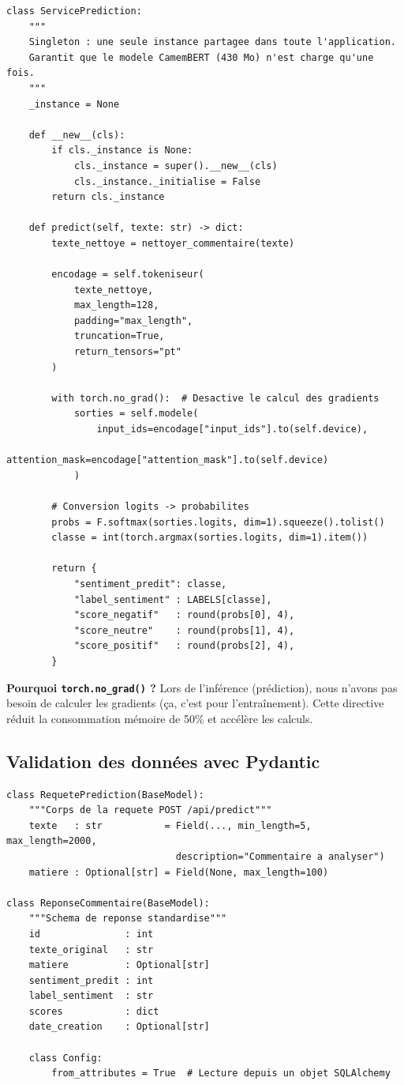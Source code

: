 \begin{lstlisting}[style=stylePython, caption={Implémentation du pattern Singleton}, label={lst:singleton}]
class ServicePrediction:
    """
    Singleton : une seule instance partagee dans toute l'application.
    Garantit que le modele CamemBERT (430 Mo) n'est charge qu'une fois.
    """
    _instance = None

    def __new__(cls):
        if cls._instance is None:
            cls._instance = super().__new__(cls)
            cls._instance._initialise = False
        return cls._instance

    def predict(self, texte: str) -> dict:
        texte_nettoye = nettoyer_commentaire(texte)

        encodage = self.tokeniseur(
            texte_nettoye,
            max_length=128,
            padding="max_length",
            truncation=True,
            return_tensors="pt"
        )

        with torch.no_grad():  # Desactive le calcul des gradients
            sorties = self.modele(
                input_ids=encodage["input_ids"].to(self.device),
                attention_mask=encodage["attention_mask"].to(self.device)
            )

        # Conversion logits -> probabilites
        probs = F.softmax(sorties.logits, dim=1).squeeze().tolist()
        classe = int(torch.argmax(sorties.logits, dim=1).item())

        return {
            "sentiment_predit": classe,
            "label_sentiment" : LABELS[classe],
            "score_negatif"   : round(probs[0], 4),
            "score_neutre"    : round(probs[1], 4),
            "score_positif"   : round(probs[2], 4),
        }
\end{lstlisting}

\textbf{Pourquoi \texttt{torch.no\_grad()} ?} Lors de l'inférence (prédiction),
nous n'avons pas besoin de calculer les gradients (ça, c'est pour
l'entraînement). Cette directive réduit la consommation mémoire de 50\%
et accélère les calculs.

\subsection{Validation des données avec Pydantic}

\begin{lstlisting}[style=stylePython, caption={Schémas de validation Pydantic}, label={lst:pydantic}]
class RequetePrediction(BaseModel):
    """Corps de la requete POST /api/predict"""
    texte   : str           = Field(..., min_length=5, max_length=2000,
                              description="Commentaire a analyser")
    matiere : Optional[str] = Field(None, max_length=100)

class ReponseCommentaire(BaseModel):
    """Schema de reponse standardise"""
    id               : int
    texte_original   : str
    matiere          : Optional[str]
    sentiment_predit : int
    label_sentiment  : str
    scores           : dict
    date_creation    : Optional[str]

    class Config:
        from_attributes = True  # Lecture depuis un objet SQLAlchemy
\end{lstlisting}

